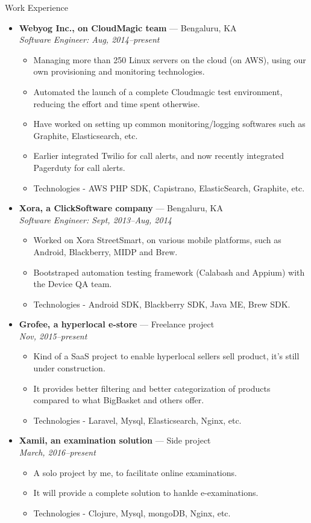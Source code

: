 \documentclass[a4paper,11pt,oneside]{article}
\newenvironment{ressection}[1]{
  \vspace{4pt}
         {\fontfamily{phv}\selectfont\Large#1}
         \begin{itemize}
           \vspace{3pt}
}{
         \end{itemize}
}
\newcommand{\ressubitem}[1]{
  \vspace{-1pt}
\item \begin{flushleft} #1 \end{flushleft}
}
\newcommand{\resbigitem}[3]{
  \vspace{-5pt}
\item
  \textbf{#1} --- #2 \\
  \textit{#3}
}
\newenvironment{ressubsec}[3]{
  \resbigitem{#1}{#2}{#3}
  \vspace{-2pt}
  \begin{itemize}
}{
  \end{itemize}
}
\begin{document}
\begin{ressection}{Work Experience}
  \begin{ressubsec}{Webyog Inc., on CloudMagic team}{Bengaluru, KA}{Software Engineer: Aug, 2014--present}
    \ressubitem{Managing more than 250 Linux servers on the cloud (on AWS), using our own provisioning and monitoring technologies.}
    \ressubitem{Automated the launch of a complete Cloudmagic test environment, reducing the effort and time spent otherwise.}
    \ressubitem{Have worked on setting up common monitoring/logging softwares such as Graphite, Elasticsearch, etc.}
    \ressubitem{Earlier integrated Twilio for call alerts, and now recently integrated Pagerduty for call alerts.}
    \ressubitem{Technologies - AWS PHP SDK, Capistrano, ElasticSearch, Graphite, etc.}
  \end{ressubsec}
  \begin{ressubsec}{Xora, a ClickSoftware company}{Bengaluru, KA}{Software Engineer: Sept, 2013--Aug, 2014}
    \ressubitem{Worked on Xora StreetSmart, on various mobile platforms, such as Android, Blackberry, MIDP and Brew.}
    \ressubitem{Bootstraped automation testing framework (Calabash and Appium) with the Device QA team.}
    \ressubitem{Technologies - Android SDK, Blackberry SDK, Java ME, Brew SDK.}
  \end{ressubsec}
  \begin{ressubsec}{Grofee, a hyperlocal e-store}{Freelance project}{Nov, 2015--present}
    \ressubitem{Kind of a SaaS project to enable hyperlocal sellers sell product, it's still under construction.}
    \ressubitem{It provides better filtering and better categorization of products compared to what BigBasket and others offer.}
    \ressubitem{Technologies - Laravel, Mysql, Elasticsearch, Nginx, etc.}
  \end{ressubsec}
  \begin{ressubsec}{Xamii, an examination solution}{Side project}{March, 2016--present}
    \ressubitem{A solo project by me, to facilitate online examinations.}
    \ressubitem{It will provide a complete solution to hanlde e-examinations.}
    \ressubitem{Technologies - Clojure, Mysql, mongoDB, Nginx, etc.}
  \end{ressubsec}

\end{ressection}
\end{document}
